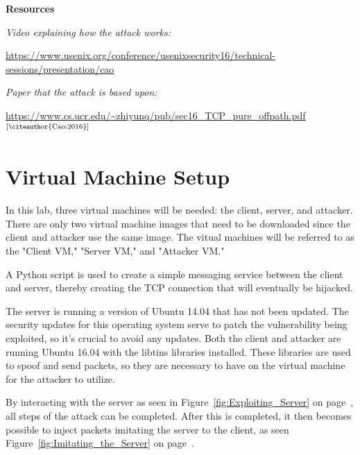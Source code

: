 \documentclass[letterpaper,12pt]{report}
\begin{document}
\begin{sloppypar}
    
\textbf{Resources}

\textit{Video explaining how the attack works:}

\url{https://www.usenix.org/conference/usenixsecurity16/technical-sessions/presentation/cao}

\textit{Paper that the attack is based upon:}

\url{https://www.cs.ucr.edu/~zhiyunq/pub/sec16_TCP_pure_offpath.pdf} $^\text{[\citeauthor{Cao:2016}]}$



\section*{Virtual Machine Setup}\label{sec:Virtual-Machine-Setup}

In this lab, three virtual machines will be needed: the client, server, and attacker. There are only two virtual machine images that need to be downloaded since the client and attacker use the same image. The vitual machines will be referred to as the "Client VM," "Server VM," and "Attacker VM."

A Python script is used to create a simple messaging service between the client and server, thereby creating the TCP connection that will eventually be hijacked. 

The server is running a version of Ubuntu 14.04 that has not been updated. The security updates for this operating system serve to patch the vulnerability being exploited, so it's crucial to avoid any updates. Both the client and attacker are running Ubuntu 16.04 with the libtins libraries installed. These libraries are used to spoof and send packets, so they are necessary to have on the virtual machine for the attacker to utilize.

By interacting with the server as seen in Figure~\ref{fig:Exploiting_Server} on page~\pageref{fig:Exploiting_Server}, all steps of the attack can be completed. After this is completed, it then becomes possible to inject packets imitating the server to the client, as seen Figure~\ref{fig:Imitating_the_Server} on page~\pageref{fig:Imitating_the_Server}.

\begin{figure}[h]
    \centering
    

\end{figure}
\end{sloppypar}
\end{document}
